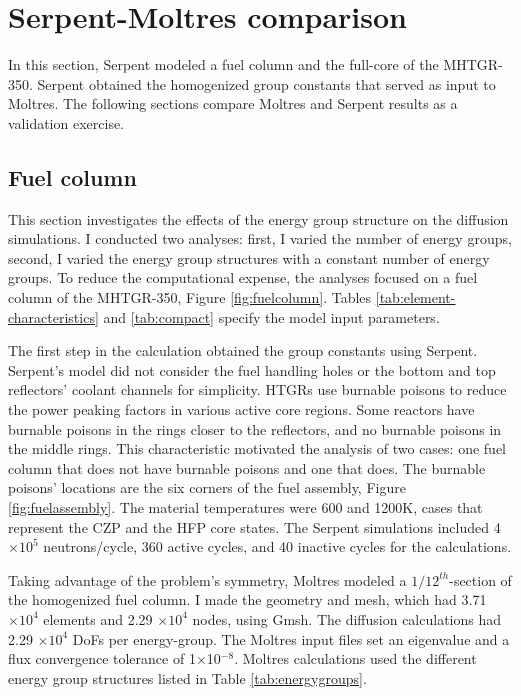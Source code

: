 \section{Serpent-Moltres comparison}
\label{sec:neut-serpent}

In this section, Serpent modeled a fuel column and the full-core of the MHTGR-350.
Serpent obtained the homogenized group constants that served as input to Moltres.
The following sections compare Moltres and Serpent results as a validation exercise.

\subsection{Fuel column}

This section investigates the effects of the energy group structure on the diffusion simulations.
I conducted two analyses: first, I varied the number of energy groups, second, I varied the energy group structures with a constant number of energy groups.
To reduce the computational expense, the analyses focused on a fuel column of the MHTGR-350, Figure \ref{fig:fuelcolumn}.
Tables \ref{tab:element-characteristics} and \ref{tab:compact} specify the model input parameters.

The first step in the calculation obtained the group constants using Serpent.
Serpent's model did not consider the fuel handling holes or the bottom and top reflectors' coolant channels for simplicity.
HTGRs use burnable poisons to reduce the power peaking factors in various active core regions.
Some reactors have burnable poisons in the rings closer to the reflectors, and no burnable poisons in the middle rings.
This characteristic motivated the analysis of two cases: one fuel column that does not have burnable poisons and one that does.
The burnable poisons' locations are the six corners of the fuel assembly, Figure \ref{fig:fuelassembly}.
The material temperatures were 600 and 1200K, cases that represent the \gls{CZP} and the \gls{HFP} core states.
The Serpent simulations included 4$\times 10^5$ neutrons/cycle, 360 active cycles, and 40 inactive cycles for the calculations.

Taking advantage of the problem's symmetry, Moltres modeled a $1/12^{th}$-section of the homogenized fuel column.
I made the geometry and mesh, which had 3.71 $\times 10^4$ elements and 2.29 $\times 10^4$ nodes, using Gmsh.
The diffusion calculations had 2.29 $\times 10^4$ \glspl{DoF} per energy-group.
The Moltres input files set an eigenvalue and a flux convergence tolerance of 1$\times$10$^{-8}$.
Moltres calculations used the different energy group structures listed in Table \ref{tab:energygroups}.

